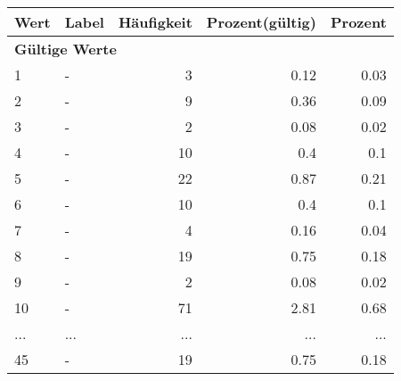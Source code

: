      \begin{longtable}{lXrrr}
     \toprule
     \textbf{Wert} & \textbf{Label} & \textbf{Häufigkeit} & \textbf{Prozent(gültig)} & \textbf{Prozent} \\
     \endhead
     \midrule
     \multicolumn{5}{l}{\textbf{Gültige Werte}}\\
        1 & \multicolumn{1}{X}{-} & %
          \num{3} &
          \num[round-mode=places,round-precision=2]{0.12} &
          \num[round-mode=places,round-precision=2]{0.03} \\
        2 & \multicolumn{1}{X}{-} & %
          \num{9} &
          \num[round-mode=places,round-precision=2]{0.36} &
          \num[round-mode=places,round-precision=2]{0.09} \\
        3 & \multicolumn{1}{X}{-} & %
          \num{2} &
          \num[round-mode=places,round-precision=2]{0.08} &
          \num[round-mode=places,round-precision=2]{0.02} \\
        4 & \multicolumn{1}{X}{-} & %
          \num{10} &
          \num[round-mode=places,round-precision=2]{0.4} &
          \num[round-mode=places,round-precision=2]{0.1} \\
        5 & \multicolumn{1}{X}{-} & %
          \num{22} &
          \num[round-mode=places,round-precision=2]{0.87} &
          \num[round-mode=places,round-precision=2]{0.21} \\
        6 & \multicolumn{1}{X}{-} & %
          \num{10} &
          \num[round-mode=places,round-precision=2]{0.4} &
          \num[round-mode=places,round-precision=2]{0.1} \\
        7 & \multicolumn{1}{X}{-} & %
          \num{4} &
          \num[round-mode=places,round-precision=2]{0.16} &
          \num[round-mode=places,round-precision=2]{0.04} \\
        8 & \multicolumn{1}{X}{-} & %
          \num{19} &
          \num[round-mode=places,round-precision=2]{0.75} &
          \num[round-mode=places,round-precision=2]{0.18} \\
        9 & \multicolumn{1}{X}{-} & %
          \num{2} &
          \num[round-mode=places,round-precision=2]{0.08} &
          \num[round-mode=places,round-precision=2]{0.02} \\
        10 & \multicolumn{1}{X}{-} & %
          \num{71} &
          \num[round-mode=places,round-precision=2]{2.81} &
          \num[round-mode=places,round-precision=2]{0.68} \\
       ... & ... & ... & ... & ... \\
        45 & \multicolumn{1}{X}{-} & %
          \num{19} &
          \num[round-mode=places,round-precision=2]{0.75} &
          \num[round-mode=places,round-precision=2]{0.18} \\


\end{longtable}

